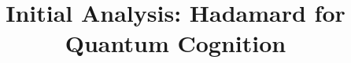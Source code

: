 \documentclass{NSF}
\begin{document}

\title{Initial Analysis: Hadamard for Quantum Cognition}



%

\newpage{}
\renewcommand\refname{References Cited}



%

%

%

%

\end{document}
